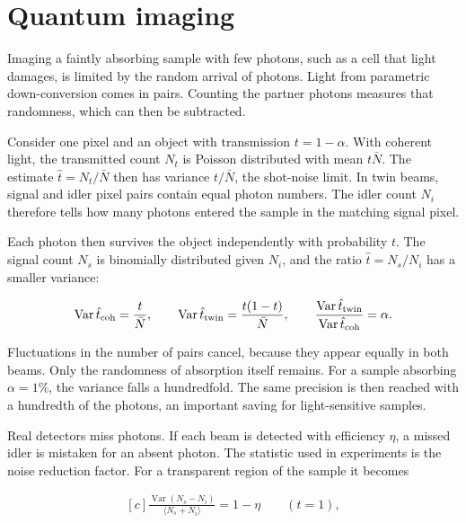 \documentclass[11pt,oneside]{book}
\newenvironment{centeredalign}{\[\begin{gathered}[c]}{\end{gathered}\]}
\begin{document}
\clearpage

\section{Quantum imaging}

\label{topic:quantum-imaging}

Imaging a faintly absorbing sample with few photons, such as a cell that light damages, is limited by the random arrival of photons. Light from parametric down-conversion comes in pairs. Counting the partner photons measures that randomness, which can then be subtracted.

Consider one pixel and an object with transmission \(t=1-\alpha\). With coherent light, the transmitted count \(N_t\) is Poisson distributed with mean \(t\bar N\). The estimate \(\hat t=N_t/\bar N\) then has variance \(t/\bar N\), the shot-noise limit. In twin beams, signal and idler pixel pairs contain equal photon numbers. The idler count \(N_i\) therefore tells how many photons entered the sample in the matching signal pixel.

Each photon then survives the object independently with probability \(t\). The signal count \(N_s\) is binomially distributed given \(N_i\), and the ratio \(\hat t=N_s/N_i\) has a smaller variance:

\begin{centeredalign}
\operatorname{Var}\hat t_{\rm coh}=\frac{t}{\bar N},\qquad
\operatorname{Var}\hat t_{\rm twin}=\frac{t(1-t)}{\bar N},\qquad
\frac{\operatorname{Var}\hat t_{\rm twin}}{\operatorname{Var}\hat t_{\rm coh}}=\alpha.
\end{centeredalign}

Fluctuations in the number of pairs cancel, because they appear equally in both beams. Only the randomness of absorption itself remains. For a sample absorbing \(\alpha=1\%\), the variance falls a hundredfold. The same precision is then reached with a hundredth of the photons, an important saving for light-sensitive samples.

Real detectors miss photons. If each beam is detected with efficiency \(\eta\), a missed idler is mistaken for an absent photon. The statistic used in experiments is the noise reduction factor. For a transparent region of the sample it becomes

\begin{centeredalign}
\frac{\operatorname{Var}(N_s-N_i)}{\langle N_s+N_i\rangle}=1-\eta\qquad(t=1),
\end{centeredalign}
\end{document}
